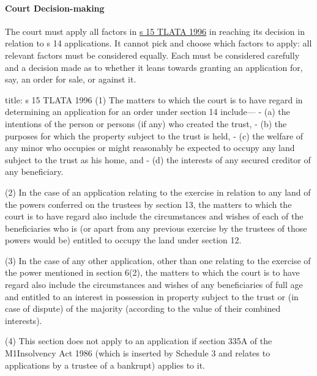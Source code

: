 \documentclass[
]{article}
\newenvironment{Shaded}{}{}
\newcommand{\NormalTok}[1]{#1}
\begin{document}
\hypertarget{court-decision-making}{%
\paragraph{Court Decision-making}\label{court-decision-making}}

The court must apply all factors in
\href{https://www.legislation.gov.uk/ukpga/1996/47/section/15}{s 15
TLATA 1996} in reaching its decision in relation to s 14 applications.
It cannot pick and choose which factors to apply: all relevant factors
must be considered equally. Each must be considered carefully and a
decision made as to whether it leans towards granting an application
for, say, an order for sale, or against it.

\begin{Shaded}
\begin{Highlighting}[]
\NormalTok{title: s 15 TLATA 1996}
\NormalTok{(1) The matters to which the court is to have regard in determining an application for an order under section 14 include—}
\NormalTok{{-} (a) the intentions of the person or persons (if any) who created the trust,}
\NormalTok{{-} (b) the purposes for which the property subject to the trust is held,}
\NormalTok{{-} (c) the welfare of any minor who occupies or might reasonably be expected to occupy any land subject to the trust as his home, and}
\NormalTok{{-} (d) the interests of any secured creditor of any beneficiary.}

\NormalTok{(2) In the case of an application relating to the exercise in relation to any land of the powers conferred on the trustees by section 13, the matters to which the court is to have regard also include the circumstances and wishes of each of the beneficiaries who is (or apart from any previous exercise by the trustees of those powers would be) entitled to occupy the land under section 12.}

\NormalTok{(3) In the case of any other application, other than one relating to the exercise of the power mentioned in section 6(2), the matters to which the court is to have regard also include the circumstances and wishes of any beneficiaries of full age and entitled to an interest in possession in property subject to the trust or (in case of dispute) of the majority (according to the value of their combined interests).}

\NormalTok{(4) This section does not apply to an application if section 335A of the M1Insolvency Act 1986 (which is inserted by Schedule 3 and relates to applications by a trustee of a bankrupt) applies to it.}
\end{Highlighting}
\end{Shaded}
\end{document}
